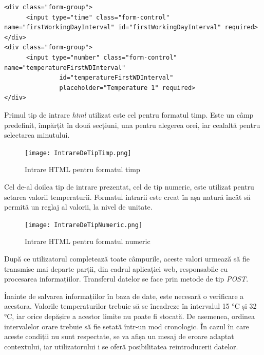 \vspace{1em}
\begin{lstlisting}
<div class="form-group">
      <input type="time" class="form-control" name="firstWorkingDayInterval" id="firstWorkingDayInterval" required>
</div>
<div class="form-group">
      <input type="number" class="form-control" name="temperatureFirstWDInterval"
               id="temperatureFirstWDInterval"
               placeholder="Temperature 1" required>
</div>
\end{lstlisting}
\vspace{1em} 

	Primul tip de intrare \textit{html} utilizat este cel pentru formatul timp. Este un câmp predefinit, împărțit în două secțiuni, una pentru alegerea orei, iar cealaltă pentru selectarea minutului.
	
\begin{figure}[H]
   	\centering
    	\texttt{[image: IntrareDeTipTimp.png]}
	\caption{Intrare HTML pentru formatul timp}
\end{figure}

	Cel de-al doilea tip de intrare prezentat, cel de tip numeric, este utilizat pentru setarea valorii temperaturii. Formatul intrarii este creat în așa natură încât să permită un reglaj al valorii, la nivel de unitate.

\begin{figure}[H]
   	\centering
    	\texttt{[image: IntrareDeTipNumeric.png]}
	\caption{Intrare HTML pentru formatul numeric}
\end{figure}

	După ce utilizatorul completează toate câmpurile, aceste valori urmează să fie transmise mai departe parții, din cadrul aplicației web, responsabile cu procesarea informațiilor. Transferul datelor se face prin metode de tip \textit{POST}.

	Înainte de salvarea informațiilor în baza de date, este necesară o verificare a acestora. Valorile temperaturilor trebuie să se încadreze în intervalul 15 °C și 32 °C, iar orice depășire a acestor limite nu poate fi stocată. De asemenea, ordinea intervalelor orare trebuie să fie setată într-un mod cronologic. În cazul în care aceste condiții nu sunt respectate, se va afișa un mesaj de eroare adaptat contextului, iar utilizatorului i se oferă posibilitatea reintroducerii datelor.


